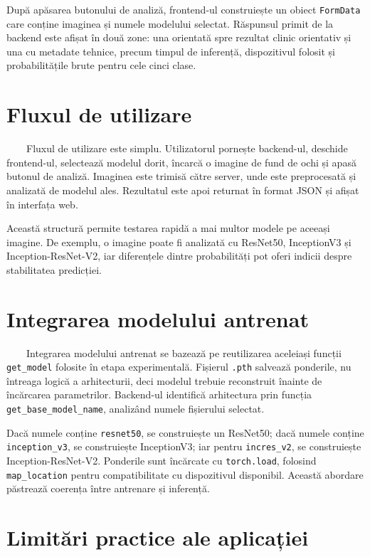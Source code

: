 \documentclass[12pt, a4paper, oneside, romanian]{teza-upb}
\begin{document}
După apăsarea butonului de analiză, frontend-ul construiește un obiect \texttt{FormData} care conține imaginea și numele modelului selectat. Răspunsul primit de la backend este afișat în două zone: una orientată spre rezultat clinic orientativ și una cu metadate tehnice, precum timpul de inferență, dispozitivul folosit și probabilitățile brute pentru cele cinci clase.

\section{Fluxul de utilizare}

\ \ \ \ Fluxul de utilizare este simplu. Utilizatorul pornește backend-ul, deschide frontend-ul, selectează modelul dorit, încarcă o imagine de fund de ochi și apasă butonul de analiză. Imaginea este trimisă către server, unde este preprocesată și analizată de modelul ales. Rezultatul este apoi returnat în format JSON și afișat în interfața web.
\bigskip

Această structură permite testarea rapidă a mai multor modele pe aceeași imagine. De exemplu, o imagine poate fi analizată cu ResNet50, InceptionV3 și Inception-ResNet-V2, iar diferențele dintre probabilități pot oferi indicii despre stabilitatea predicției.

\section{Integrarea modelului antrenat}

\ \ \ \ Integrarea modelului antrenat se bazează pe reutilizarea aceleiași funcții \texttt{get\_model} folosite în etapa experimentală. Fișierul \texttt{.pth} salvează ponderile, nu întreaga logică a arhitecturii, deci modelul trebuie reconstruit înainte de încărcarea parametrilor. Backend-ul identifică arhitectura prin funcția \texttt{get\_base\_model\_name}, analizând numele fișierului selectat.
\bigskip

Dacă numele conține \texttt{resnet50}, se construiește un ResNet50; dacă numele conține \texttt{inception\_v3}, se construiește InceptionV3; iar pentru \texttt{incres\_v2}, se construiește Inception-ResNet-V2. Ponderile sunt încărcate cu \texttt{torch.load}, folosind \texttt{map\_location} pentru compatibilitate cu dispozitivul disponibil. Această abordare păstrează coerența între antrenare și inferență.

\section{Limitări practice ale aplicației}
\end{document}
